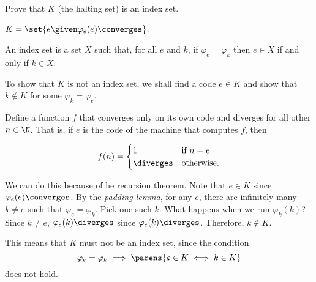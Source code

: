 \begin{problem}[4]
  Prove that $K$ (the halting set) is  an index set.

  \begin{enumarabic}
    \item $K = \set{ e \given \varphi_e(e) \converges }$.
    \item An index set is a set $X$ such that, for all $e$ and $k$,
      if $\varphi_e = \varphi_k$ then $e \in X$ if and only if $k \in X$.
  \end{enumarabic}



  \begin{answer}

    To show that $K$ is not an index set,
    we shall find a code $e \in K$ and show that $k \not \in K$
    for some $\varphi_k = \varphi_e$.

    \step
    Define a function $f$ that converges only on its own code and diverges
    for all other $n \in \N$. That is, if $e$ is the code of the
    machine that computes $f$, then

    \[
      f(n) = \begin{cases}
        1 & \text{if } n = e \\
        \diverges & \text{otherwise.}
      \end{cases}
    \]

    \step
    We can do this because of he recursion theorem.
    Note that $e \in K$ since $\varphi_e(e) \converges$.
    By the \emph{padding lemma}, for any $e$, there are infinitely
    many $k \neq e$ such that $\varphi_e = \varphi_k$.
    Pick one such $k$.
    What happens when we run $\varphi_k(k)$?
    Since $k \neq e$, $\varphi_e(k) \diverges$ since $\varphi_e(k) \diverges$.
    Therefore, $k \not\in K$.

    \step
    This means that $K$ must not be an index set, since
    the condition
    \[ \varphi_e = \varphi_k \implies \parens{e \in K \iff k \in K} \]
    does not hold.
  \end{answer}
\end{problem}
